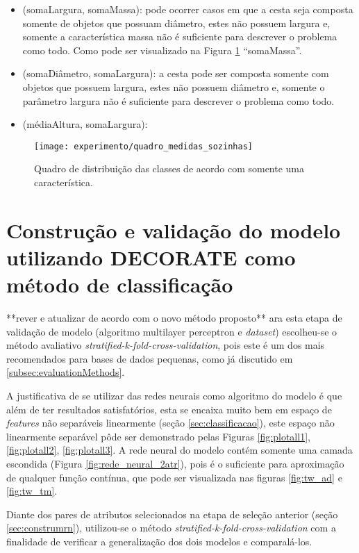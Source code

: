 \begin{itemize}
\item (somaLargura, somaMassa): pode ocorrer casos em que a cesta seja composta somente de objetos que possuam diâmetro, estes não possuem largura e, somente a característica massa não é suficiente para descrever o problema como todo. Como pode ser visualizado na Figura \ref{fig:quadro_medidas_sozinhas} ``somaMassa''.
\item (somaDiâmetro, somaLargura): a cesta pode ser composta somente com objetos que possuem largura, estes não possuem diâmetro e, somente o parâmetro largura não é suficiente para descrever o problema como todo.
\item (médiaAltura, somaLargura):
\end{itemize}

\begin{figure}[!htb] \centering 
  \centering
  \texttt{[image: experimento/quadro\_medidas\_sozinhas]} 
  \caption{Quadro de distribuição das classes de acordo com somente uma característica.} 
  \label{fig:quadro_medidas_sozinhas}
\end{figure}

\section{Construção e validação do modelo utilizando DECORATE como método de classificação}
\label{sec:constvalidacao}**rever e atualizar de acordo com o novo método proposto**
ara esta etapa de validação de modelo (algoritmo multilayer perceptron e \textit{dataset}) escolheu-se o método avaliativo \textit{stratified-k-fold-cross-validation}, pois este é um dos mais recomendados para bases de dados pequenas, como já discutido em \ref{subsec:evaluationMethods}. 

A justificativa de se utilizar das redes neurais como algoritmo do modelo é que além de ter resultados satisfatórios, esta se encaixa muito bem em espaço de \textit{features} não separáveis linearmente (seção \ref{sec:classificacao}), este espaço não linearmente separável pôde ser demonstrado pelas Figuras \ref{fig:plotall1}, \ref{fig:plotall2}, \ref{fig:plotall3}. A rede neural do modelo contém somente uma camada escondida (Figura \ref{fig:rede_neural_2atr}), pois é o suficiente para aproximação de qualquer função contínua\cite{Pasini:2015}, que pode ser visualizada nas figuras \ref{fig:tw_ad} e \ref{fig:tw_tm}.

Diante dos pares de atributos selecionados na etapa de seleção anterior (seção \ref{sec:construmrn}), utilizou-se o método \textit{stratified-k-fold-cross-validation} com a finalidade de verificar a generalização dos dois modelos e comparalá-los.

